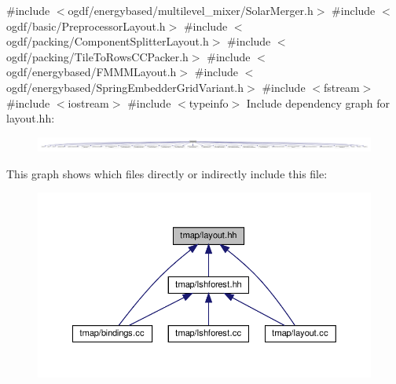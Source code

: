 {\ttfamily \#include $<$ogdf/energybased/multilevel\+\_\+mixer/\+Solar\+Merger.\+h$>$}\newline
{\ttfamily \#include $<$ogdf/basic/\+Preprocessor\+Layout.\+h$>$}\newline
{\ttfamily \#include $<$ogdf/packing/\+Component\+Splitter\+Layout.\+h$>$}\newline
{\ttfamily \#include $<$ogdf/packing/\+Tile\+To\+Rows\+C\+C\+Packer.\+h$>$}\newline
{\ttfamily \#include $<$ogdf/energybased/\+F\+M\+M\+M\+Layout.\+h$>$}\newline
{\ttfamily \#include $<$ogdf/energybased/\+Spring\+Embedder\+Grid\+Variant.\+h$>$}\newline
{\ttfamily \#include $<$fstream$>$}\newline
{\ttfamily \#include $<$iostream$>$}\newline
{\ttfamily \#include $<$typeinfo$>$}\newline
Include dependency graph for layout.\+hh\+:\nopagebreak
\begin{figure}[H]
\begin{center}
\leavevmode
\includegraphics[width=350pt]{layout_8hh__incl}
\end{center}
\end{figure}
This graph shows which files directly or indirectly include this file\+:\nopagebreak
\begin{figure}[H]
\begin{center}
\leavevmode
\includegraphics[width=350pt]{layout_8hh__dep__incl}
\end{center}
\end{figure}
